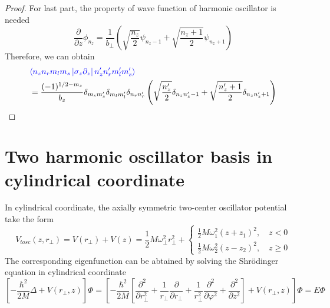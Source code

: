 \begin{proof}
    For last part, the property of wave function of harmonic oscillator is needed
    \begin{equation}
      \frac{\partial}{\partial z} \phi_{n_z} = \frac{1}{b_\perp} \left( \sqrt{\frac{n_z}{2}}\psi_{n_z -1} + \sqrt{\frac{n_z + 1}{2}} \psi_{n_z + 1} \right)
    \end{equation}
    Therefore, we can obtain
    \begin{equation}
      \begin{aligned}
        &\textcolor{blue}{\left\langle n_z n_r m_l m_s \left| \sigma_z \partial_z \right| n_z^{\prime} n_r^{\prime} m_l^{\prime} m_s^{\prime} \right\rangle}\\
        &=\frac{(-1)^{1 / 2-m_{s}}}{b_{z}} \delta_{m_{s} m_{s}^{\prime}} \delta_{m_{l} m_{l}^{\prime}} \delta_{n_{r} n_{r}^{\prime}}\left(\sqrt{\frac{n_{z}^{\prime}}{2}} \delta_{n_{z} n_{z}^{\prime}-1}+\sqrt{\frac{n_{z}^{\prime}+1}{2}} \delta_{n_{z} n_{z}^{\prime}+1}\right)
      \end{aligned}
    \end{equation}
  \end{proof}

  \section{Two harmonic oscillator basis in cylindrical coordinate}

  In cylindrical coordinate, the axially symmetric two-center oscillator potential take the form
  \begin{equation}
    V_{tosc}(z, r_\perp) = V(r_\perp) + V(z) = \frac{1}{2} M \omega_\perp^2 r_\perp^2 + 
    \begin{cases}
      \frac{1}{2} M \omega_1^2(z + z_1)^2, \quad  z<0\\
      \frac{1}{2} M \omega_2^2(z - z_2)^2, \quad  z \geqslant 0
    \end{cases}
  \end{equation}
  The corresponding eigenfunction can be abtained by solving the Shr{\"o}dinger equation in cylindrical coordinate
  \begin{equation}
    \left[-\frac{\hbar^{2}}{2 M} \Delta+V\left(r_{\perp}, z\right)\right] \Phi=\left[-\frac{\hbar^{2}}{2 M}\left[\frac{\partial^{2}}{\partial r_{\perp}^{2}}+\frac{1}{r_{\perp}} \frac{\partial}{\partial r_{\perp}}+\frac{1}{r_{\perp}^{2}} \frac{\partial^{2}}{\partial \varphi^{2}}+\frac{\partial^{2}}{\partial z^{2}}\right]+V\left(r_{\perp}, z\right)\right] \Phi=E \Phi \label{tc_shrodinger}
  \end{equation}


